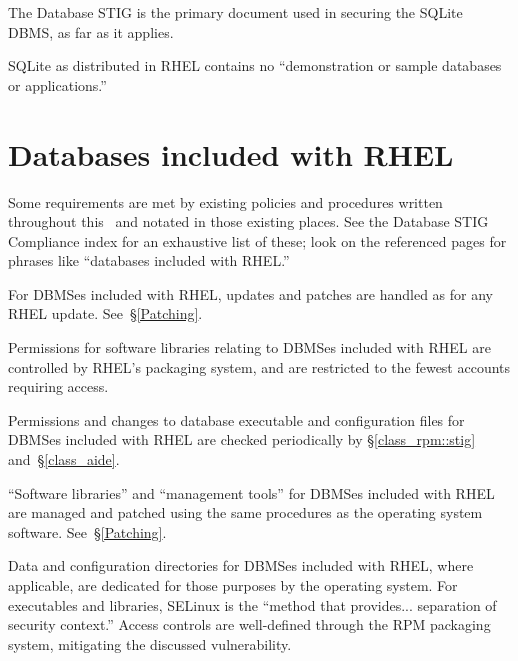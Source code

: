 %
The Database STIG is the primary document used in securing the SQLite
DBMS, as far as it applies.

%
SQLite as distributed in RHEL contains no ``demonstration or sample
data\-bases or applications.''





\section{Databases included with RHEL}
\label{dbms-with-rhel}

Some requirements are met by existing policies and procedures written
throughout this \CMITSPolicy\, and notated in those existing places. See
the Database STIG Compliance index for an exhaustive list of these; look
on the referenced pages for phrases like ``databases included with RHEL.''

%
For DBMSes included with RHEL, updates and patches are handled as for any
RHEL update. See~\S\ref{Patching}.

%
Permissions for software libraries relating to DBMSes included with RHEL
are controlled by RHEL's packaging system, and are restricted to the
fewest accounts requiring access. 

%
Permissions and changes to database executable and configuration files for
DBMSes included with RHEL are checked periodically by
\S\ref{class_rpm::stig} and~\S\ref{class_aide}.

%
``Software libraries'' and ``management tools'' for DBMSes included with
RHEL are managed and patched using the same procedures as the operating
system software. See~\S\ref{Patching}.

%
Data and configuration directories for DBMSes included with RHEL, where
applicable, are dedicated for those purposes by the operating system.
For executables and libraries, SELinux is the ``method that provides...
separation of security context.'' Access controls are well-defined through
the RPM packaging system, mitigating the discussed vulnerability.

